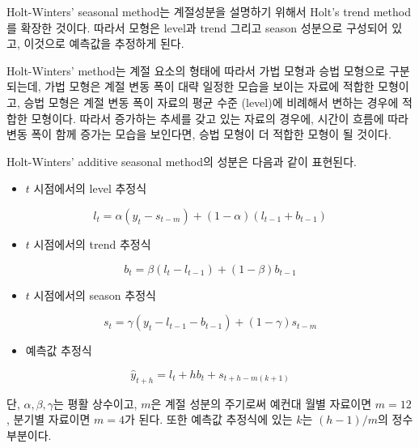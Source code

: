 \documentclass[
]{book}
\providecommand{\tightlist}{%
  \setlength{\itemsep}{0pt}\setlength{\parskip}{0pt}}
\begin{document}
Holt-Winters' seasonal method는 계절성분을 설명하기 위해서 Holt's trend method를 확장한 것이다. 따라서 모형은 level과 trend 그리고 season 성분으로 구성되어 있고, 이것으로 예측값을 추정하게 된다.

Holt-Winters' method는 계절 요소의 형태에 따라서 가법 모형과 승법 모형으로 구분되는데, 가법 모형은 계절 변동 폭이 대략 일정한 모습을 보이는 자료에 적합한 모형이고, 승법 모형은 계절 변동 폭이 자료의 평균 수준 (level)에 비례해서 변하는 경우에 적합한 모형이다. 따라서 증가하는 추세를 갖고 있는 자료의 경우에, 시간이 흐름에 따라 변동 폭이 함께 증가는 모습을 보인다면, 승법 모형이 더 적합한 모형이 될 것이다.

Holt-Winters' additive seasonal method의 성분은 다음과 같이 표현된다.

\begin{itemize}
\tightlist
\item
  \(t\) 시점에서의 level 추정식
\end{itemize}

\begin{equation}
l_{t} = \alpha (y_{t} - s_{t-m}) + (1-\alpha)(l_{t-1}+b_{t-1})
\end{equation}

\begin{itemize}
\tightlist
\item
  \(t\) 시점에서의 trend 추정식
\end{itemize}

\begin{equation}
b_{t} = \beta (l_{t} - l_{t-1}) + (1-\beta)b_{t-1}
\end{equation}

\begin{itemize}
\tightlist
\item
  \(t\) 시점에서의 season 추정식
\end{itemize}

\begin{equation}
s_{t} = \gamma (y_{t} - l_{t-1} - b_{t-1}) + (1-\gamma) s_{t-m}
\end{equation}

\begin{itemize}
\tightlist
\item
  예측값 추정식
\end{itemize}

\begin{equation}
\hat{y}_{t+h} = l_{t} + hb_{t} + s_{t+h-m(k+1)}
\end{equation}

단, \(\alpha, \beta, \gamma\)는 평활 상수이고, \(m\)은 계절 성분의 주기로써 예컨대 월별 자료이면 \(m=12\), 분기별 자료이면 \(m=4\)가 된다. 또한 예측값 추정식에 있는 \(k\)는 \((h-1)/m\)의 정수 부분이다.
\end{document}

